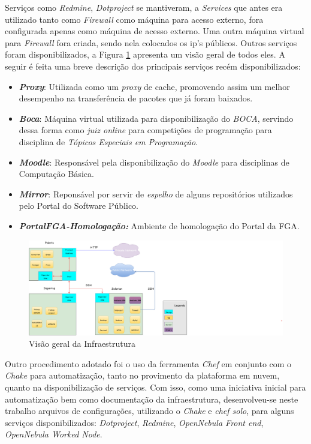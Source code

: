 Serviços como \textit{Redmine}, \textit{Dotproject} se mantiveram, a \textit{Services} que antes era utilizado tanto como \textit{Firewall} como máquina para acesso externo, fora configurada apenas como máquina de acesso externo. Uma outra máquina virtual para \textit{Firewall} fora criada, sendo nela colocados os ip's públicos. Outros serviços foram disponibilizados, a Figura \ref{fig:vm_infra} apresenta um visão geral de todos eles. A seguir é feita uma breve descrição dos principais serviços recém disponibilizados:

\begin{itemize}
\item \textbf{\textit{Proxy}}: Utilizada como um \textit{proxy} de cache, promovendo assim um melhor desempenho na transferência de pacotes que já foram baixados.
\item \textbf{\textit{Boca}}: Máquina virtual utilizada para disponibilização do \textit{BOCA}, servindo dessa forma como \textit{juiz online} para competições de programação para disciplina de \textit{Tópicos Especiais em Programação}.
\item \textbf{\textit{Moodle}}: Responsável pela disponibilização do \textit{Moodle} para disciplinas de Computação Básica.
\item \textbf{\textit{Mirror}}: Reponsável por servir de \textit{espelho} de alguns repositórios utilizados pelo Portal do Software Público.
\item \textbf{\textit{PortalFGA-Homologação:}} Ambiente de homologação do Portal da FGA.

\end{itemize}


\begin{figure}[!h]
\centering
\includegraphics [keepaspectratio=true,scale=0.4]{figuras/vm_infra.eps}
\caption{Visão geral da Infraestrutura}
\label{fig:vm_infra}
\end{figure}

Outro procedimento adotado foi o uso da ferramenta \textit{Chef} em conjunto com o \textit{Chake} para automatização, tanto no provimento da plataforma em nuvem, quanto na disponibilização de serviços. Com isso, como uma iniciativa inicial para automatização bem como documentação da infraestrutura, desenvolveu-se neste trabalho arquivos de configurações, utilizando o \textit{Chake} e \textit{chef solo}, para alguns serviços disponibilizados: \textit{Dotproject}, \textit{Redmine}, \textit{OpenNebula Front end}, \textit{OpenNebula Worked Node}.










